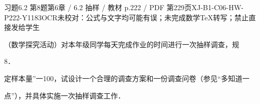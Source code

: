 \begin{bankitem}{习题6.2 第8题}{第6章 / 6.2 抽样 / 教材 p.222 / PDF 第229页}{XJ-B1-C06-HW-P222-Y1183}{OCR未校对：公式与文字均可能有误；未完成数学TeX转写；禁止直接发给学生}
\begin{ocrdraft}
\par
（数学探究活动）对本年级同学每天完成作业的时间进行一次抽样调查，规
\par
8．
\par
定样本量”一100，试设计一个合理的调查方案和一份调查问卷（参见“多知道一
\par
点”），并具体实施一次抽样调查工作．
\end{ocrdraft}
\end{bankitem}
